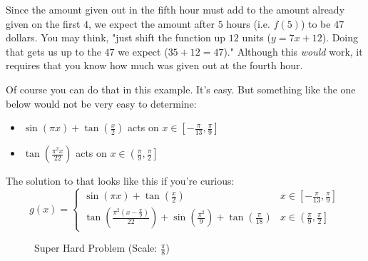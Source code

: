 Since the amount given out in the fifth hour must add to the amount already given on the first $4$, we expect the amount after $5$ hours (i.e. $f(5)$) to be $47$ dollars.
\clearpage
You may think, "just shift the function up $12$ units ($y = 7x + 12$). Doing that gets us up to the $47$ we expect ($35 + 12 = 47$)." Although this \textit{would} work, it requires that you know how much was given out at the fourth hour.

Of course you can do that in this example. It's easy. But something like the one below would not be very easy to determine:
\begin{itemize}
    \item $\sin\left(\pi x\right)+\tan\left(\frac{x}{2}\right)$ acts on $x \in \left[-\frac{\pi}{13}, \frac{\pi}{9} \right]$
    \item $\tan\left(\frac{\pi^{2}x}{22}\right)$ acts on $x \in \left(\frac{\pi}{9}, \frac{\pi}{2}\right]$
\end{itemize}
The solution to that looks like this if you're curious:
\[
g(x) = 
\begin{cases}
    \sin\left(\pi x\right)+\tan\left(\frac{x}{2}\right) & 
    x \in \left[-\frac{\pi}{13}, \frac{\pi}{9} \right] \\
    \tan\left(\frac{\pi^{2}\left(x-\frac{\pi}{9}\right)}{22}\right)+\sin\left(\frac{\pi^{2}}{9}\right)+\tan\left(\frac{\pi}{18}\right) & 
    x \in \left(\frac{\pi}{9}, \frac{\pi}{2}\right]
\end{cases}
\]
\vspace{-0.5cm}
\begin{figure}[ht]
    \centering
    \caption{Super Hard Problem (Scale: $\frac{\pi}{8}$)}
\end{figure}
\clearpage
